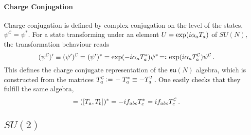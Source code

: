 \paragraph{Charge Conjugation}

Charge conjugation is defined by complex conjugation on the level of the states, ${\psi^\mathcal{C}=\psi^*}$.  For a state transforming under an element ${U=\exp({i}\alpha_a T_a)}$ of $SU(N)$, the transformation behaviour reads
\begin{equation}
    (\psi^\mathcal{C})^\prime\equiv(\psi^\prime)^\mathcal{C}=(\psi^\prime)^*=\exp(-{i}\alpha_aT_a^*)\psi^*{\,=\vcentcolon\,}\exp({i}\alpha_aT_a^\mathcal{C})\psi^\mathcal{C}\,.
\end{equation}
This defines the charge conjugate representation of the $\mathfrak{su}(N)$ algebra, which is constructed from the matrices ${T_a^\mathcal{C}{\,\vcentcolon=\,} -T_a^*\equiv -T_a^T}$. One easily checks that they fulfill the same algebra,
\begin{equation}
    [T_a^\mathcal{C},T_b^\mathcal{C}]=([T_a,T_b])^*=-\imagu f_{abc}T_c^*=\imagu f_{abc}T_c^\mathcal{C}\,.
\end{equation}

\subsection{$SU(2)$}

